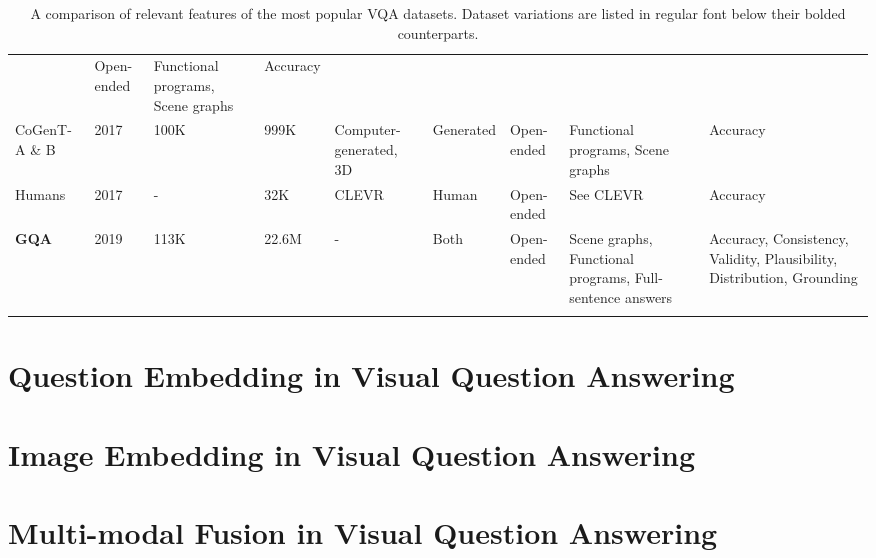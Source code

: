 \begin{center}
\begin{xltabular}{\textwidth}{LLLLLLLLL}
  & Open-ended
  & Functional programs, Scene graphs
  & Accuracy \\
  CoGenT-A \& B
  & 2017
  & 100K
  & 999K
  & Computer-generated, 3D 
  & Generated
  & Open-ended
  & Functional programs, Scene graphs
  & Accuracy \\
  Humans
  & 2017
  & -
  & 32K  %
  & CLEVR
  & Human
  & Open-ended
  & See CLEVR
  & Accuracy \\
  \textbf{GQA} \cite{hudson2019gqa}
  & 2019
  & 113K  %
  & 22.6M  %
  & -
  & Both
  & Open-ended
  & Scene graphs, Functional programs, Full-sentence answers
  & Accuracy, Consistency, Validity, Plausibility, Distribution, Grounding \\
  \bottomrule
  \caption{A comparison of relevant features of the most popular VQA datasets. Dataset variations are listed in regular font below their bolded counterparts.}
  \label{tab:dataset_comparison}
\end{xltabular}
\end{center}



\section{Question Embedding in Visual Question Answering}

\section{Image Embedding in Visual Question Answering}

\section{Multi-modal Fusion in Visual Question Answering}